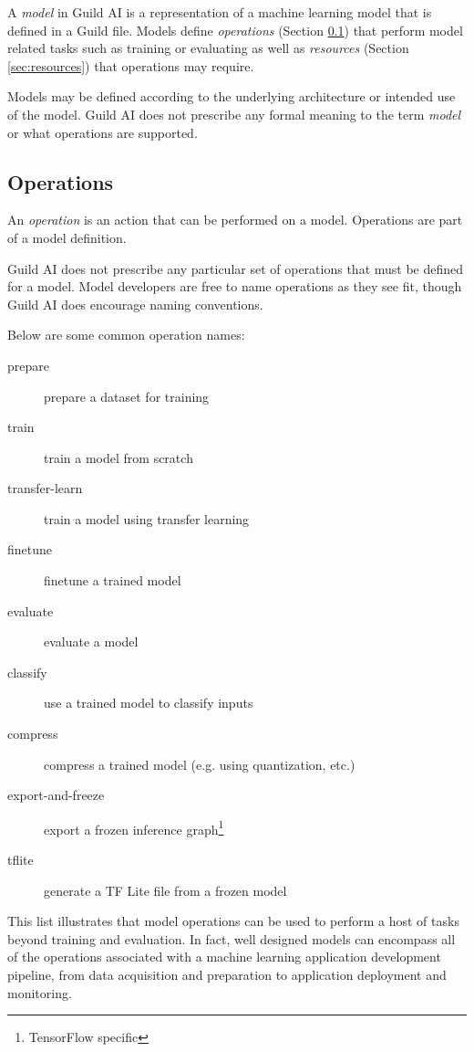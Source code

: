 \documentclass{article}
\begin{document}
A \emph{model} in Guild AI is a representation of a machine learning
model that is defined in a Guild file. Models define \emph{operations}
(Section \ref{sec:operations}) that perform model related tasks such
as training or evaluating as well as \emph{resources} (Section
\ref{sec:resources}) that operations may require.

Models may be defined according to the underlying architecture or
intended use of the model. Guild AI does not prescribe any formal
meaning to the term \emph{model} or what operations are supported.

\subsection{Operations}
\label{sec:operations}

An \emph{operation} is an action that can be performed on a
model. Operations are part of a model definition.

Guild AI does not prescribe any particular set of operations that must
be defined for a model. Model developers are free to name operations
as they see fit, though Guild AI does encourage naming conventions.

Below are some common operation names:

\begin{description}
\item[prepare] prepare a dataset for training
\item[train] train a model from scratch
\item[transfer-learn] train a model using transfer learning
\item[finetune] finetune a trained model
\item[evaluate] evaluate a model
\item[classify] use a trained model to classify inputs
\item[compress] compress a trained model (e.g. using quantization,
  etc.)
\item[export-and-freeze] export a frozen inference
  graph\footnote{TensorFlow specific}
\item[tflite] generate a TF Lite file from a frozen
  model\footnotemark[\value{footnote}]
\end{description}

This list illustrates that model operations can be used to perform a
host of tasks beyond training and evaluation. In fact, well designed
models can encompass all of the operations associated with a machine
learning application development pipeline, from data acquisition and
preparation to application deployment and monitoring.
\end{document}
